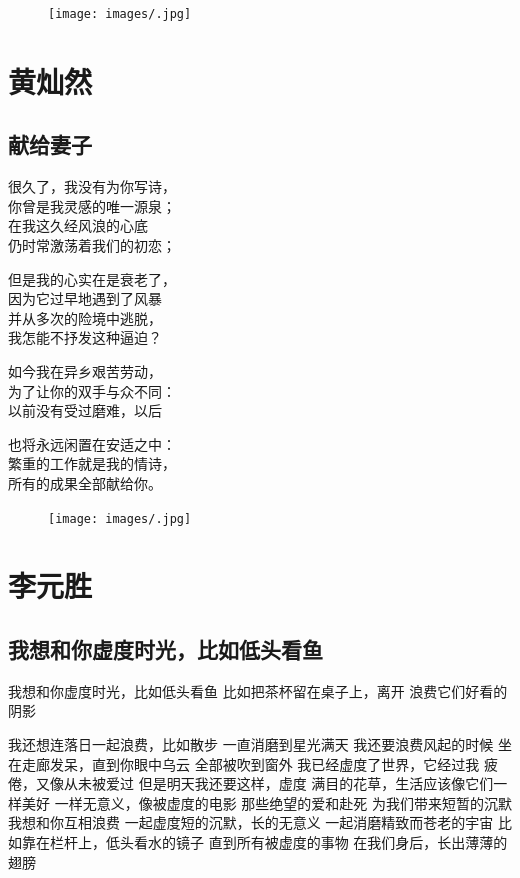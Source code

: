 \documentclass[]{book}
\renewenvironment{quote}{\begin{VF}}{\end{VF}}
\begin{document}
\begin{figure}[htbp]
\centering
\texttt{[image: images/.jpg]}
\caption{}
\end{figure}

\chapter{黄灿然}

\section{献给妻子}

\begin{quote}
很久了，我没有为你写诗，\\
你曾是我灵感的唯一源泉；\\
在我这久经风浪的心底\\
仍时常激荡着我们的初恋；

但是我的心实在是衰老了，\\
因为它过早地遇到了风暴\\
并从多次的险境中逃脱，\\
我怎能不抒发这种逼迫？

如今我在异乡艰苦劳动，\\
为了让你的双手与众不同：\\
以前没有受过磨难，以后

也将永远闲置在安适之中：\\
繁重的工作就是我的情诗，\\
所有的成果全部献给你。
\end{quote}

\begin{figure}[htbp]
\centering
\texttt{[image: images/.jpg]}
\caption{}
\end{figure}

\chapter{李元胜}

\section{我想和你虚度时光，比如低头看鱼}

\begin{quote}
我想和你虚度时光，比如低头看鱼 比如把茶杯留在桌子上，离开
浪费它们好看的阴影

我还想连落日一起浪费，比如散步 一直消磨到星光满天 我还要浪费风起的时候
坐在走廊发呆，直到你眼中乌云 全部被吹到窗外 我已经虚度了世界，它经过我
疲倦，又像从未被爱过 但是明天我还要这样，虚度
满目的花草，生活应该像它们一样美好 一样无意义，像被虚度的电影
那些绝望的爱和赴死 为我们带来短暂的沉默 我想和你互相浪费
一起虚度短的沉默，长的无意义 一起消磨精致而苍老的宇宙
比如靠在栏杆上，低头看水的镜子 直到所有被虚度的事物
在我们身后，长出薄薄的翅膀
\end{quote}
\end{document}
